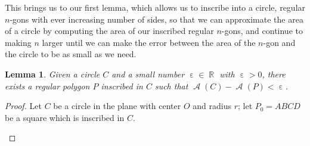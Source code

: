 \documentclass[letterpaper, 12pt]{amsart}
\DeclareMathOperator{\R}{\mathbb{R}}
\DeclareMathOperator{\A}{\mathcal{A}}
\DeclareMathOperator{\ep}{\varepsilon}
\newtheorem{lemma}[thm]{Lemma}
\theoremstyle{definition}  %
\begin{document}
		This brings us to our first lemma, which allows us to inscribe into a circle, regular $n$-gons with ever increasing number of sides, so that we can approximate the area of a circle by computing the area of our inscribed regular $n$-gons, and continue to making $n$ larger until we can make the error between the area of the $n$-gon and the circle to be as small as we need.

		\begin{lemma}
		Given a circle $C$ and a small number $\ep \in \R$ with $\ep > 0$, there exists a regular polygon $P$ inscribed in $C$ such that $\A(C) - \A(P) < \ep$.
		\end{lemma}
		\begin{proof}
		Let $C$ be a circle in the plane with center $O$ and radius $r$; let $P_{0} = ABCD$ be a square which is inscribed in $C$.

		\begin{figure}[b]


\end{figure}
\end{proof}
\end{document}
